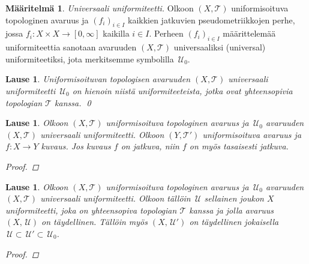 \documentclass[12pt,a4paper,leqno]{report}
\newcommand{\U}{\,\mathcal{U}}
\newcommand{\T}{\mathcal{T}}
\theoremstyle{plain}
\newtheorem{lause}[equation]{Lause}
\theoremstyle{definition}
\newtheorem{maar}[equation]{Määritelmä}
\theoremstyle{remark}
\begin{document}
\begin{maar}
\emph{Universaali uniformiteetti.} 
Olkoon $(X,\T)$ uniformisoituva topologinen avaruus ja 
$(f_i)_{i\in I}$ kaikkien jatkuvien pseudometriikkojen perhe, 
jossa $f_i\colon X\times X\rightarrow [0,\infty]$ 
kaikilla $i\in I$. 
Perheen $(f_i)_{i\in I}$ määrittelemää uniformiteettia sanotaan avaruuden $(X,\T)$ universaaliksi (universal) uniformiteetiksi, 
jota merkitsemme symbolilla $\U_0$. 
\end{maar}
\begin{lause}
Uniformisoituvan topologisen avaruuden $(X,\T)$ universaali uniformiteetti $\U_0$ on hienoin niistä uniformiteeteista, jotka ovat yhteensopivia topologian $\T$ kanssa. 
\qed
\end{lause}
\begin{lause}
Olkoon $(X,\T)$ uniformisoituva topologinen avaruus ja 
$\U_0$ avaruuden $(X,\T)$ universaali uniformiteetti. 
Olkoon $(Y,\T')$ uniformisoituva avaruus ja $f\colon X\rightarrow Y$ 
kuvaus. 
Jos kuvaus $f$ on jatkuva, %
niin $f$ on myös tasaisesti jatkuva. %
\begin{proof}
\end{proof}
\end{lause}
\begin{lause}
Olkoon $(X,\T)$ uniformisoituva topologinen avaruus ja 
$\U_0$ avaruuden $(X,\T)$ universaali uniformiteetti. 
Olkoon tällöin  
$\U$ sellainen joukon $X$ uniformiteetti, 
joka on yhteensopiva topologian $\T$ kanssa ja 
jolla avaruus $(X,\U)$ on täydellinen. 
Tällöin myös $(X,\U')$ on täydellinen jokaisella 
$\U\subset\U'\subset\U_0$.
\begin{proof}
\end{proof}
\end{lause}
%
%
\end{document}
